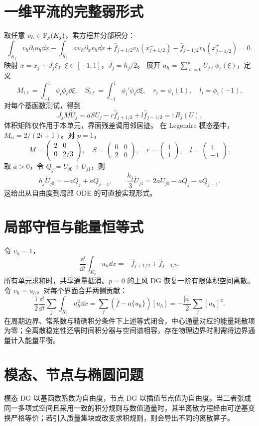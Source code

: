 \section{一维平流的完整弱形式}
取任意 $v_h\in\mathbb P_p(K_j)$，乘方程并分部积分：
\[
\int_{K_j}v_h\partial_tu_h\dd x
-\int_{K_j}a u_h\partial_xv_h\dd x
+\widehat f_{j+1/2}v_h(x_{j+1/2}^{-})
-\widehat f_{j-1/2}v_h(x_{j-1/2}^{+})=0.
\]
映射 $x=x_j+J_j\xi$，$\xi\in[-1,1]$，$J_j=h_j/2$。
展开 $u_h=\sum_{\ell=0}^pU_{j\ell}\phi_\ell(\xi)$，定义
\[
M_{i\ell}=\int_{-1}^1\phi_i\phi_\ell\dd\xi,\quad
S_{i\ell}=\int_{-1}^1\phi_i'\phi_\ell\dd\xi,\quad
r_i=\phi_i(1),\quad l_i=\phi_i(-1).
\]
对每个基函数测试，得到
\begin{equation}\label{eq:dg-local}
J_jM\dot U_j=a S U_j-r\widehat f_{j+1/2}+l\widehat f_{j-1/2}
=:R_j(U).
\end{equation}
体积矩阵仅作用于本单元，界面残差调用邻居迹。
在 Legendre 模态基中，
$M_{ii}=2/(2i+1)$。对 $p=1$，
\[
M=\begin{pmatrix}2&0\\0&2/3\end{pmatrix},\quad
S=\begin{pmatrix}0&0\\2&0\end{pmatrix},\quad
r=\begin{pmatrix}1\\1\end{pmatrix},\quad
l=\begin{pmatrix}1\\-1\end{pmatrix}.
\]
取 $a>0$，令 $Q_j=U_{j0}+U_{j1}$，则
\[
h_j\dot U_{j0}=-aQ_j+aQ_{j-1},\qquad
\frac{h_j}{3}\dot U_{j1}=2aU_{j0}-aQ_j-aQ_{j-1}.
\]
这给出从自由度到局部 ODE 的可直接实现形式。

\section{局部守恒与能量恒等式}
令 $v_h=1$，
\[
\frac{\dd}{\dd t}\int_{K_j}u_h\dd x
=-\widehat f_{j+1/2}+\widehat f_{j-1/2}.
\]
所有单元求和时，共享通量抵消。$p=0$ 的上风 DG 恢复一阶有限体积空间离散。
令 $v_h=u_h$，对每个界面合并两侧贡献：
\[
\frac12\frac{\dd}{\dd t}\sum_j\int_{K_j}u_h^2\dd x
=\sum_f\left(\widehat f-a\{u_h\}\right)[u_h]
=-\frac{|a|}{2}\sum_f[u_h]^2.
\]
在周期边界、常系数与精确积分条件下上述等式闭合，中心通量对应的能量耗散项为零；全离散稳定性还需时间积分器与空间谱相容，存在物理边界时则需将边界通量计入能量平衡。

\section{模态、节点与椭圆问题}
模态 DG 以基函数系数为自由度，节点 DG 以插值节点值为自由度。当二者张成同一多项式空间且采用一致的积分规则与数值通量时，其半离散方程经由可逆基变换严格等价；若引入质量集块或改变求积规则，则会导出不同的离散算子。

